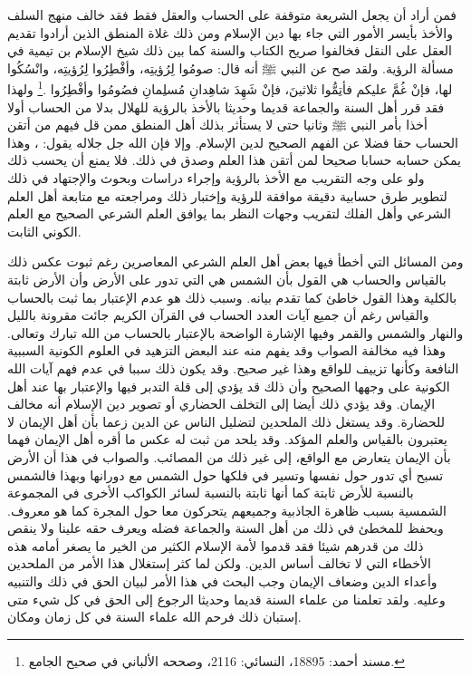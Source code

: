 فمن أراد أن يجعل الشريعة متوقفة على الحساب والعقل فقط فقد خالف منهج السلف والأخذ بأيسر الأمور التي جاء بها دين الإسلام ومن ذلك غلاة المنطق الذين أرادوا تقديم العقل على النقل فخالفوا صريح الكتاب والسنة كما بين ذلك شيخ الإسلام بن تيمية في مسألة الرؤية. ولقد صح عن النبي ﷺ أنه قال: صومُوا لِرُؤيتِه، وأفْطِرُوا لِرُؤيتِه، وانْسُكُوا لها، فإنْ غُمَّ عليكم فأتِمُّوا ثلاثينَ، فإنْ شَهِدَ شاهِدانِ مُسلِمانِ فصُومُوا وأفْطِرُوا \href{https://shamela.ws/book/25794/15398#p2}{\faExternalLink} \href{https://shamela.ws/book/21659/7259#p1}{\faExternalLink} \cite{ahmid}.\footnote{مسند أحمد: 18895، النسائي: 2116، وصححه الألباني في صحيح الجامع.} ولهذا فقد قرر أهل السنة والجماعة قديما وحديثا بالأخذ بالرؤية للهلال بدلا من الحساب أولا أخذا بأمر النبي ﷺ وثانيا حتى لا يستأثر بذلك أهل المنطق ممن قل فيهم من أتقن الحساب حقا فضلا عن الفهم الصحيح لدين الإسلام. وإلا فإن الله جل جلاله يقول: \quranayah*[55][5]{\footnotesize \surahname*[55]}، وهذا يمكن حسابه حسابا صحيحا لمن أتقن هذا العلم وصدق في ذلك. فلا يمنع أن يحسب ذلك ولو على وجه التقريب مع الأخذ بالرؤية وإجراء دراسات وبحوث والإجتهاد في ذلك لتطوير طرق حسابية دقيقة موافقة للرؤية وإختبار ذلك ومراجعته مع متابعة أهل العلم الشرعي وأهل الفلك لتقريب وجهات النظر بما يوافق العلم الشرعي الصحيح مع العلم الكوني الثابت.

ومن المسائل التي أخطأ فيها بعض أهل العلم الشرعي المعاصرين رغم ثبوت عكس ذلك بالقياس والحساب هي القول بأن الشمس هي التي تدور على الأرض وأن الأرض ثابتة بالكلية وهذا القول خاطئ كما تقدم بيانه. وسبب ذلك هو عدم الإعتبار بما ثبت بالحساب والقياس رغم أن جميع آيات العدد الحساب في القرآن الكريم جائت مقرونة بالليل والنهار والشمس والقمر وفيها الإشارة الواضحة بالإعتبار بالحساب من الله تبارك وتعالى. وهذا فيه مخالفة الصواب وقد يفهم منه عند البعض التزهيد في العلوم الكونية السببية النافعة وكأنها تزييف للواقع وهذا غير صحيح. وقد يكون ذلك سببا في عدم فهم آيات الله الكونية على وجهها الصحيح وأن ذلك قد يؤدي إلى قلة التدبر فيها والإعتبار بها عند أهل الإيمان. وقد يؤدي ذلك أيضا إلى التخلف الحضاري أو تصوير دين الإسلام أنه مخالف للحضارة. وقد يستغل ذلك الملحدين لتضليل الناس عن الدين زعما بأن أهل الإيمان لا يعتبرون بالقياس والعلم المؤكد. وقد يلحد من ثبت له عكس ما أقره أهل الإيمان فهما بأن الإيمان يتعارض مع الواقع، إلى غير ذلك من المصائب. والصواب في هذا أن الأرض تسبح أي تدور حول نفسها وتسير في فلكها حول الشمس مع دورانها وبهذا فالشمس بالنسبة للأرض ثابتة كما أنها ثابتة بالنسبة لسائر الكواكب الأخرى في المجموعة الشمسية بسبب ظاهرة الجاذبية وجميعهم يتحركون معا حول المجرة كما هو معروف. ويحفظ للمخطئ في ذلك من أهل السنة والجماعة فضله ويعرف حقه علينا ولا ينقص ذلك من قدرهم شيئا فقد قدموا لأمة الإسلام الكثير من الخير ما يصغر أمامه هذه الأخطاء التي لا تخالف أساس الدين. ولكن لما كثر إستغلال هذا الأمر من الملحدين وأعداء الدين وضعاف الإيمان وجب البحث في هذا الأمر لبيان الحق في ذلك والتنبيه وعليه. ولقد تعلمنا من علماء السنة قديما وحديثا الرجوع إلى الحق في كل شيء متى إستبان ذلك فرحم الله علماء السنة في كل زمان ومكان. 

